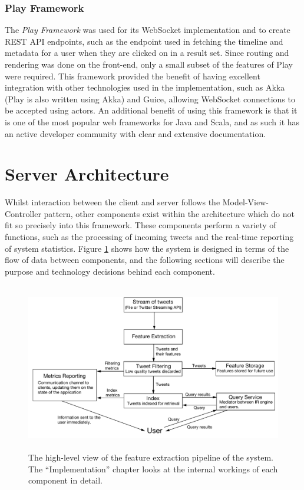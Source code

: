 \documentclass{l4proj}
\begin{document}
        \subsubsection{Play Framework}
        The \textit{Play Framework} was used for its WebSocket implementation and to create REST API endpoints, such as the endpoint used in fetching the timeline and metadata for a user when they are clicked on in a result set. Since routing and rendering was done on the front-end, only a small subset of the features of Play were required. This framework provided the benefit of having excellent integration with other technologies used in the implementation, such as Akka (Play is also written using Akka) and Guice, allowing WebSocket connections to be accepted using actors. An additional benefit of using this framework is that it is one of the most popular web frameworks for Java and Scala, and as such it has an active developer community with clear and extensive documentation.
    
    \section{Server Architecture}
    Whilst interaction between the client and server follows the Model-View-Controller pattern, other components exist within the architecture which do not fit so precisely into this framework. These components perform a variety of functions, such as the processing of incoming tweets and the real-time reporting of system statistics. Figure \ref{architecture} shows how the system is designed in terms of the flow of data between components, and the following sections will describe the purpose and technology decisions behind each component.
    
\begin{figure}[H]
\centering
\includegraphics[height=278px,width=496px]{architecture.pdf}
\caption{The high-level view of the feature extraction pipeline of the system. The ``Implementation'' chapter looks at the internal workings of each component in detail.}
\label{architecture}
\end{figure}
    
\end{document}
